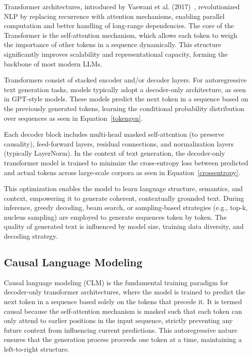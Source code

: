 Transformer architectures, introduced by Vaswani et al. (2017)~\cite{vaswani2017attention}, revolutionized NLP by
replacing recurrence with attention mechanisms, enabling parallel computation and better
handling of long-range dependencies. The core of the Transformer is the self-attention
mechanism, which allows each token to weigh the importance of other tokens in a sequence
dynamically. This structure significantly improves scalability and representational capacity,
forming the backbone of most modern LLMs.

Transformers consist of stacked encoder and/or decoder layers. For autoregressive text
generation tasks, models typically adopt a decoder-only architecture, as seen in GPT-style
models. These models predict the next token in a sequence based on the previously
generated tokens, learning the conditional probability distribution over sequences as seen
in Equation~\ref{tokengen}.

Each decoder block includes multi-head masked self-attention (to preserve causality),
feed-forward layers, residual connections, and normalization layers (typically LayerNorm).
In the context of text generation, the decoder-only transformer model is trained to minimize
the cross-entropy loss between predicted and actual tokens across large-scale corpora
as seen in Equation~\ref{crossentropy}.

This optimization enables the model to learn language structure, semantics, and context,
empowering it to generate coherent, contextually grounded text. During inference,
greedy decoding, beam search, or sampling-based strategies (e.g., top-k, nucleus sampling)
are employed to generate sequences token by token. The quality of generated text
is influenced by model size, training data diversity, and decoding strategy.

\subsection{Causal Language Modeling}

Causal language modeling (CLM) is the fundamental training paradigm for decoder-only
transformer architectures, where the model is trained to predict the next token in a
sequence based solely on the tokens that precede it. It is termed causal because the self-attention
mechanism is masked such that each token can only attend to earlier positions
in the input sequence, strictly preventing any future context from influencing current
predictions. This autoregressive nature ensures that the generation process proceeds one
token at a time, maintaining a left-to-right structure.

